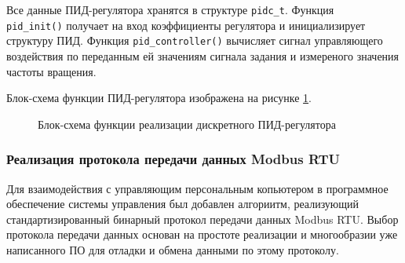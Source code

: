         Все данные ПИД-регулятора хранятся в структуре \verb"pidс_t". Функция\\
        \verb"pid_init()" получает на вход коэффициенты регулятора и
        инициализирует структуру ПИД. Функция \verb"pid_controller()" вычисляет
        сигнал управляющего воздействия по переданным ей значениям сигнала
        задания и измереного значения частоты вращения.

        Блок-схема функции ПИД-регулятора изображена на рисунке \ref{fig:bs-pid}.

        \begin{figure}[ph!]
            \caption{Блок-схема функции реализации дискретного ПИД-регулятора}
            \label{fig:bs-pid}
        \end{figure}

    \newpage
    \subsubsection{Реализация протокола передачи данных Modbus RTU}
        Для взаимодействия с управляющим персональным копьютером в программное
        обеспечение системы управления был добавлен алгориитм, реализующий
        стандартизированный бинарный протокол передачи данных Modbus RTU. Выбор
        протокола передачи данных основан на простоте реализации и многообразии
        уже написанного ПО для отладки и обмена данными по этому протоколу.

